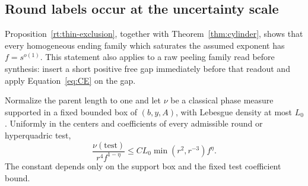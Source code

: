 \subsection{Round labels occur at the uncertainty scale}

Proposition~\ref{rt:thin-exclusion}, together with
Theorem~\ref{thm:cylinder}, shows that every homogeneous ending family
which saturates the assumed exponent has $f=s^{o(1)}$.  This statement
also applies to a raw peeling family read before synthesis: insert a
short positive free gap immediately before that readout and apply
Equation~\eqref{eq:CE} on the gap.

\begin{lemma}
\label{lem:rt-test-volume}
Normalize the parent length to one and let $\nu$ be a classical
phase measure supported in a fixed bounded box of $(b,y,A)$, with
Lebesgue density at most $L_0$.  Uniformly in the centers and
coefficients of every admissible round or hyperquadric test,
\begin{equation}\label{eq:rt-test-volume}
 \frac{\nu(\text{test})}{r^4f^{1-\eta}}
 \le C L_0\min(r^2,r^{-3})f^\eta.
\end{equation}
The constant depends only on the support box and the fixed test
coefficient bound.
\end{lemma}

